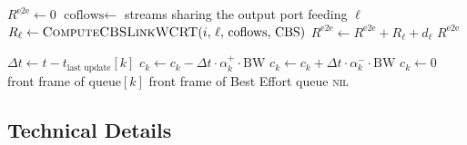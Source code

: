 \documentclass[11pt,a4paper]{article}
\begin{document}
\begin{algorithm}[H]
\caption{Compute End-to-End WCRT}
\label{algo:e2e_wcrt}
\begin{algorithmic}[1]
    \State $R^{\mathrm{e2e}} \gets 0$
        \State $\text{coflows} \gets$ streams sharing the output port feeding $\ell$
        \State $R_\ell \gets \Call{ComputeCBSLinkWCRT}{i,\,\ell,\,\text{coflows},\,\text{CBS}}$
        \State $R^{\mathrm{e2e}} \gets R^{\mathrm{e2e}} + R_\ell + d_\ell$
    \EndFor
    \State \Return $R^{\mathrm{e2e}}$
\EndProcedure
\end{algorithmic}
\end{algorithm}

\begin{algorithm}[H]
\caption{CBS Port Selection Policy (Simulator)}
\label{algo:cbs_select}
\begin{algorithmic}[1]
        \State $\Delta t \gets t - t_{\text{last update}}[k]$
            \State $c_k \gets c_k - \Delta t \cdot \alpha_k^+ \cdot \mathrm{BW}$
            \State $c_k \gets c_k + \Delta t \cdot \alpha_k^- \cdot \mathrm{BW}$
        \EndIf
            \State $c_k \gets 0$ 
        \EndIf
    \EndFor
            \State \Return front frame of queue$[k]$
        \EndIf
    \EndFor
        \State \Return front frame of Best Effort queue
    \EndIf
    \State \Return \textsc{nil} 
\EndProcedure
\end{algorithmic}
\end{algorithm}

\subsection{Technical Details}
\end{document}
